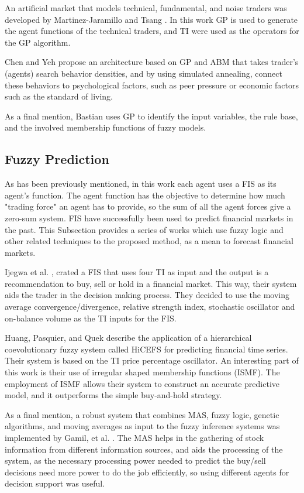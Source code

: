 \documentclass[12pt,journal,compsoc]{IEEEtran}
\begin{document}
An artificial market that models technical, fundamental, and noise traders was developed by Martinez-Jaramillo and Tsang \cite{Martinez-Jaramillo2009}. In this work GP is used to generate the agent functions \cite{russell2003artificial} of the technical traders, and TI were used as the operators for the GP algorithm.

Chen and Yeh \cite{Chen2001} propose an architecture based on GP and ABM that takes trader's (agents) search behavior densities, and by using simulated annealing, connect these behaviors to psychological factors, such as peer pressure or economic factors such as the standard of living.

As a final mention, Bastian \cite{Bastian2000} uses GP to identify the input variables, the rule base, and the involved membership functions of fuzzy models.

\subsection{Fuzzy Prediction}
\label{fuzzy-prediction}

As has been previously mentioned, in this work each agent uses a FIS as its agent's function. The agent function has the objective to determine how much "trading force" an agent has to provide, so the sum of all the agent forces give a zero-sum system. FIS have successfully been used to predict financial markets in the past. This Subsection provides a series of works which use fuzzy logic and other related techniques to the proposed method, as a mean to forecast financial markets.

Ijegwa et al. \cite{Ijegwa2014}, crated a FIS that uses four TI as input and the output is a recommendation to buy, sell or hold in a financial market. This way, their system aids the trader in the decision making process. They decided to use the moving average convergence/divergence, relative strength index, stochastic oscillator and on-balance volume as the TI inputs for the FIS.

Huang, Pasquier, and Quek \cite{Huang2009} describe the application of a hierarchical coevolutionary fuzzy system called HiCEFS for predicting financial time series. Their system is based on the TI price percentage oscillator. An interesting part of this work is their use of irregular shaped membership functions (ISMF). The employment of ISMF allows their system to construct an accurate predictive model, and it outperforms the simple buy-and-hold strategy.

As a final mention, a robust system that combines MAS, fuzzy logic, genetic algorithms, and moving averages as input to the fuzzy inference systems was implemented by Gamil, et al. \cite{Gamil2007}. The MAS helps in the gathering of stock information from different information sources, and aids the processing of the system, as the necessary processing power needed to predict the buy/sell decisions need more power to do the job efficiently, so using different agents for decision support was useful.
\end{document}

